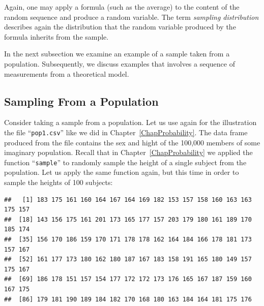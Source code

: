 \documentclass[
]{krantz}
\makeatletter
\newenvironment{Shaded}{\begin{snugshade}}{\end{snugshade}}
\newcommand{\DecValTok}[1]{\textcolor[rgb]{0.00,0.00,0.81}{#1}}
\newcommand{\FloatTok}[1]{\textcolor[rgb]{0.00,0.00,0.81}{#1}}
\newcommand{\KeywordTok}[1]{\textcolor[rgb]{0.13,0.29,0.53}{\textbf{#1}}}
\newcommand{\NormalTok}[1]{#1}
\newcommand{\OperatorTok}[1]{\textcolor[rgb]{0.81,0.36,0.00}{\textbf{#1}}}
\newcommand{\StringTok}[1]{\textcolor[rgb]{0.31,0.60,0.02}{#1}}
\newenvironment{kframe}{%
\medskip{}
\setlength{\fboxsep}{.8em}
 \def\at@end@of@kframe{}%
 \ifinner\ifhmode%
  \def\at@end@of@kframe{\end{minipage}}%
  \begin{minipage}{\columnwidth}%
 \fi\fi%
 \def\FrameCommand##1{\hskip\@totalleftmargin \hskip-\fboxsep
 \colorbox{shadecolor}{##1}\hskip-\fboxsep
     \hskip-\linewidth \hskip-\@totalleftmargin \hskip\columnwidth}%
 \MakeFramed {\advance\hsize-\width
   \@totalleftmargin\z@ \linewidth\hsize
   \@setminipage}}%
 {\par\unskip\endMakeFramed%
 \at@end@of@kframe}
\renewenvironment{Shaded}{\begin{kframe}}{\end{kframe}}
\theoremstyle{definition}
\theoremstyle{definition}
\theoremstyle{definition}
\theoremstyle{remark}
\makeatother
\begin{document}
Again, one may apply a formula (such as the average) to the content of
the random sequence and produce a random variable. The term \emph{sampling
distribution} describes again the distribution that the random variable
produced by the formula inherits from the sample.

In the next subsection we examine an example of a sample taken from a
population. Subsequently, we discuss examples that involves a sequence
of measurements from a theoretical model.

\hypertarget{sampling-from-a-population}{%
\subsection{Sampling From a Population}\label{sampling-from-a-population}}

Consider taking a sample from a population. Let us use again for the
illustration the file ``\texttt{pop1.csv}'' like we did in
Chapter~\ref{ChapProbability}. The data frame produced from the file
contains the sex and hight of the 100,000 members of some imaginary
population. Recall that in Chapter~\ref{ChapProbability} we applied the
function ``\texttt{sample}'' to randomly sample the height of a single subject
from the population. Let us apply the same function again, but this time
in order to sample the heights of 100 subjects:

\begin{Shaded}
\end{Shaded}

\begin{verbatim}
##   [1] 183 175 161 160 164 167 164 169 182 153 157 158 160 163 163 175 157
##  [18] 143 156 175 161 201 173 165 177 157 203 179 180 161 189 170 185 174
##  [35] 156 170 186 159 170 171 178 178 162 164 184 166 178 181 173 157 167
##  [52] 161 177 173 180 162 180 187 167 183 158 191 165 180 149 157 175 167
##  [69] 186 178 151 157 154 177 172 172 173 176 165 167 187 159 160 167 175
##  [86] 179 181 190 189 184 182 170 168 180 163 184 164 181 175 176
\end{verbatim}
\end{document}
